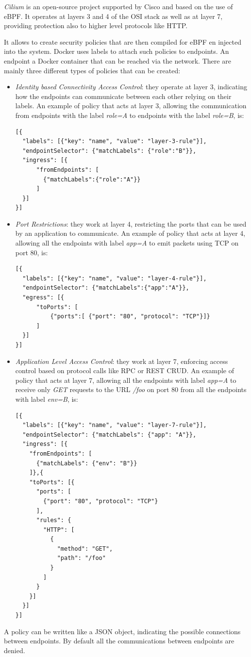 \documentclass[a4paper,12pt]{article}
\begin{document}
\textit{Cilium} \cite{cilium_github} is an open-source project supported by
Cisco and based on the use of eBPF. It operates at layers 3 and 4 of the OSI
stack as well as at layer 7, providing protection also to higher level protocols
like HTTP. \par It allows to create security policies that are then compiled for
eBPF en injected into the system. Docker uses labels to attach such policies to
endpoints. An endpoint a Docker container that can be reached via the network.
There are mainly three different types of policies that can be created:
\begin{itemize}
  \item \textit{Identity based Connectivity Access Control}: they operate at
  layer 3, indicating how the endpoints can communicate between each other
  relying on their labels. An example of policy that acts at layer 3, allowing
  the communication from endpoints with the label \textit{role=A} to endpoints
  with the label \textit{role=B}, is:
  \begin{lstlisting}
[{
  "labels": [{"key": "name", "value": "layer-3-rule"}],
  "endpointSelector": {"matchLabels": {"role":"B"}},
  "ingress": [{
      "fromEndpoints": [
        {"matchLabels":{"role":"A"}}
      ]
  }]
}]
  \end{lstlisting}
  \item \textit{Port Restrictions}: they work at layer 4, restricting the ports
  that can be used by an application to communicate. An example of policy that
  acts at layer 4, allowing all the endpoints with label \textit{app=A} to emit
  packets using TCP on port 80, is:
  \begin{lstlisting}
[{
  "labels": [{"key": "name", "value": "layer-4-rule"}],
  "endpointSelector": {"matchLabels":{"app":"A"}},
  "egress": [{
      "toPorts": [
          {"ports":[ {"port": "80", "protocol": "TCP"}]}
      ]
  }]
}]
  \end{lstlisting}
  \item \textit{Application Level Access Control}: they work at layer 7,
  enforcing access control based on protocol calls like RPC or REST CRUD. An
  example of policy that acts at layer 7, allowing all the endpoints with label
  \textit{app=A} to receive only \textit{GET} requests to the URL \textit{/foo}
  on port 80 from all the endpoints with label \textit{env=B}, is:
  \begin{lstlisting}
[{
  "labels": [{"key": "name", "value": "layer-7-rule"}],
  "endpointSelector": {"matchLabels": {"app": "A"}},
  "ingress": [{
    "fromEndpoints": [
      {"matchLabels": {"env": "B"}}
    ]},{
    "toPorts": [{
      "ports": [
        {"port": "80", "protocol": "TCP"}
      ],
      "rules": {
        "HTTP": [
          {
            "method": "GET",
            "path": "/foo"
          }
        ]
      }
    }]
  }]
}]
\end{lstlisting}
\end{itemize} 
A policy can be written like a JSON object, indicating the possible connections
between endpoints. By default all the communications between endpoints are
denied.
\end{document}
